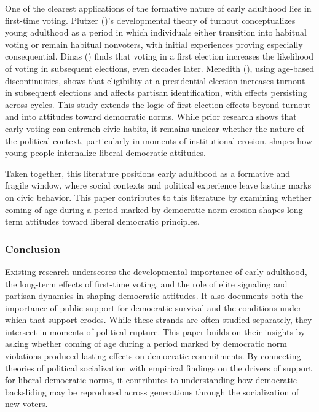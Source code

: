 \documentclass[
  10pt,
  letterpaper,
  DIV=11,
  numbers=noendperiod]{scrartcl}
\begin{document}
One of the clearest applications of the formative nature of early
adulthood lies in first-time voting. Plutzer
()'s developmental theory of turnout
conceptualizes young adulthood as a period in which individuals either
transition into habitual voting or remain habitual nonvoters, with
initial experiences proving especially consequential. Dinas
() finds that voting in a first election
increases the likelihood of voting in subsequent elections, even decades
later. Meredith (), using age-based
discontinuities, shows that eligibility at a presidential election
increases turnout in subsequent elections and affects partisan
identification, with effects persisting across cycles. This study
extends the logic of first-election effects beyond turnout and into
attitudes toward democratic norms. While prior research shows that early
voting can entrench civic habits, it remains unclear whether the nature
of the political context, particularly in moments of institutional
erosion, shapes how young people internalize liberal democratic
attitudes.

Taken together, this literature positions early adulthood as a formative
and fragile window, where social contexts and political experience leave
lasting marks on civic behavior. This paper contributes to this
literature by examining whether coming of age during a period marked by
democratic norm erosion shapes long-term attitudes toward liberal
democratic principles.

\subsubsection{Conclusion}\label{conclusion}

Existing research underscores the developmental importance of early
adulthood, the long-term effects of first-time voting, and the role of
elite signaling and partisan dynamics in shaping democratic attitudes.
It also documents both the importance of public support for democratic
survival and the conditions under which that support erodes. While these
strands are often studied separately, they intersect in moments of
political rupture. This paper builds on their insights by asking whether
coming of age during a period marked by democratic norm violations
produced lasting effects on democratic commitments. By connecting
theories of political socialization with empirical findings on the
drivers of support for liberal democratic norms, it contributes to
understanding how democratic backsliding may be reproduced across
generations through the socialization of new voters.
\end{document}
